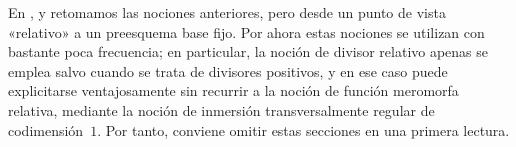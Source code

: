 En ,  y  retomamos las nociones anteriores, pero desde un punto de vista «relativo» a un preesquema base fijo.
Por ahora estas nociones se utilizan con bastante poca frecuencia; en particular, la noción de divisor relativo apenas se emplea salvo cuando se trata de divisores positivos, y en ese caso puede explicitarse ventajosamente sin recurrir a la noción de función meromorfa relativa, mediante la noción de inmersión transversalmente regular de codimensión~$1$.
Por tanto, conviene omitir estas secciones en una primera lectura.
